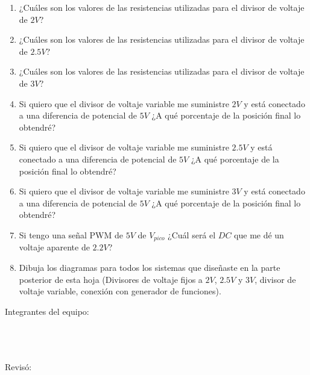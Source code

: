 	\begin{enumerate}
		\item ¿Cuáles son los valores de las resistencias utilizadas para el divisor de voltaje de $2 V$? \newline
		\item ¿Cuáles son los valores de las resistencias utilizadas para el divisor de voltaje de $2.5 V$? \newline
		\item ¿Cuáles son los valores de las resistencias utilizadas para el divisor de voltaje de $3 V$? \newline
		\item Si quiero que el divisor de voltaje variable me suministre $2 V$ y está conectado a una diferencia de potencial de $5 V$ ¿A qué porcentaje de la posición final lo obtendré? \newline
		\item Si quiero que el divisor de voltaje variable me suministre $2.5 V$ y está conectado a una diferencia de potencial de $5 V$ ¿A qué porcentaje de la posición final lo obtendré? \newline
		\item Si quiero que el divisor de voltaje variable me suministre $3 V$ y está conectado a una diferencia de potencial de $5 V$ ¿A qué porcentaje de la posición final lo obtendré? \newline
		\item Si tengo una señal PWM de $5 V$ de $V_{pico}$ ¿Cuál será el $DC$ que me dé un voltaje aparente de $2.2 V$?\newline
		\item Dibuja los diagramas para todos los sistemas que diseñaste en la parte posterior de esta hoja (Divisores de voltaje fijos a $2 V$, $2.5 V$ y $3 V$, divisor de voltaje variable, conexión con generador de funciones). \newline \newline \newline \newline \newline
	\end{enumerate}

	Integrantes del equipo: \\[0.2cm]
	\horrule{0.5pt} \\[0.2cm] %
	\horrule{0.5pt} \\[0.2cm] %
	\horrule{0.5pt} \\[0.2cm] %
	\horrule{0.5pt} %

	Revisó: \\[0.2cm]
	\horrule{0.5pt} \\%



